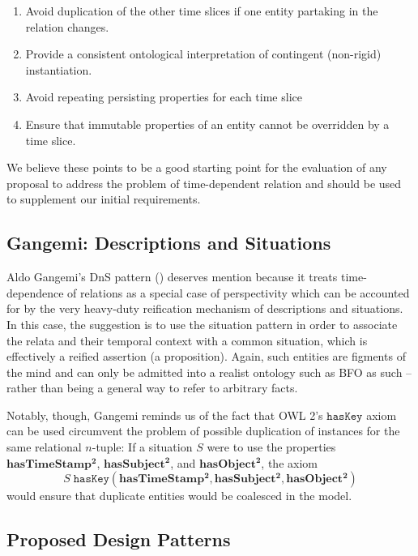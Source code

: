 \documentclass[10pt]{bmc_article}
\newcommand{\mirel}[1]{\ensuremath{\mathrm{\mathbf{#1}}}}
\newcommand{\mclass}[1]{\ensuremath{\mathit{#1}}}
\newcommand{\mrel}[2]{\mirel{#1^#2}}
\newcommand{\mrelb}[1]{\mrel{#1}{2}}
\newenvironment{bmcformat}{\baselineskip20pt\sloppy\setboolean{publ}{false}}{\baselineskip20pt\sloppy}
\begin{document}
\begin{bmcformat}
\begin{enumerate}
\item Avoid duplication of the other time slices if one entity partaking in the
relation changes.
\item Provide a consistent ontological interpretation of contingent (non-rigid)
instantiation.
\item Avoid repeating persisting properties for each time slice
\item Ensure that immutable properties of an entity cannot be overridden by a
time slice.
\end{enumerate}

We believe these points to be a good starting point for the evaluation of
any proposal to address the problem of time-dependent relation and should be
used to supplement our initial requirements.

\subsection*{Gangemi: Descriptions and Situations}
Aldo Gangemi's DnS pattern (\cite{Gangemi:DnS}) deserves mention because it treats
time-dependence of relations as a special case of perspectivity which can be
accounted for by the very heavy-duty reification mechanism of descriptions and
situations. In this case, the suggestion is to use the situation pattern in
order to associate the relata and their temporal context with a common
situation, which is effectively a reified assertion (a proposition). Again, such
entities are figments of the mind and can only be admitted into a realist
ontology such as BFO as such -- rather than being a general way to refer to
arbitrary facts. 

Notably, though, Gangemi reminds us of the fact that OWL 2's $\mathtt{hasKey}$
axiom can be used circumvent the problem of possible duplication of instances
for the same relational $n$-tuple: If a situation $\mclass{S}$ were to use the properties
$\mrelb{hasTimeStamp}$, $\mrelb{hasSubject}$, and $\mrelb{hasObject}$, the axiom
\begin{equation}
\mclass{S}\;\mathtt{hasKey}(\mrelb{hasTimeStamp}, \mrelb{hasSubject},
\mrelb{hasObject})
\end{equation}
would ensure that duplicate entities would be coalesced in the model.


\subsection*{Proposed Design Patterns}


\end{bmcformat}
\end{document}
